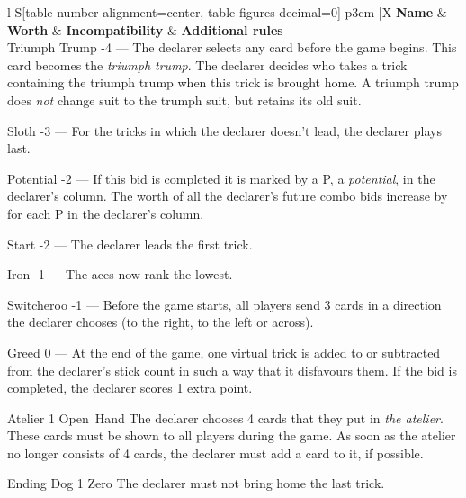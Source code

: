 \begin{table}
	\caption{Special bids}\label{tab:specialBids}
	\begin{center}
		\begin{tabularx}{\textwidth}{
			l
			S[table-number-alignment=center, table-figures-decimal=0]
			p{3cm}
			|X
		}
			\textbf{Name} &
			\textbf{Worth} &
			\textbf{Incompatibility} &
			\textbf{Additional rules}
			\\[-3ex]

			\specialBidItem%
			{Triumph Trump}
			{-4}
			{---}
			{%
				The declarer selects any card before the game begins. This card becomes the \emph{triumph trump}. The declarer decides who takes a trick containing the triumph trump when this trick is brought home. A triumph trump does \emph{not} change suit to the trumph suit, but retains its old suit.
			}

			\specialBidItem%
			{Sloth}
			{-3}
			{---}
			{%
				For the tricks in which the declarer doesn't lead, the declarer plays last.
			}

			\specialBidItem%
			{Potential}
			{-2}
			{---}
			{%
				If this bid is completed it is marked by a P, a \emph{potential}, in the declarer's column. The worth of all the declarer's future combo bids increase by  for each P in the declarer's column.
			}

			\specialBidItem%
			{Start}
			{-2}
			{---}
			{%
				The declarer leads the first trick.
			}

			\specialBidItem%
			{Iron}
			{-1}
			{---}
			{%
				The aces now rank the lowest.
			}

			\specialBidItem%
			{Switcheroo}
			{-1}
			{---}
			{%
				Before the game starts, all players send 3 cards in a direction the declarer chooses (to the right, to the left or across).
			}

			\specialBidItem%
			{Greed}
			{0}
			{---}
			{%
				At the end of the game, one virtual trick is added to or subtracted from the declarer's stick count in such a way that it disfavours them. If the bid is completed, the declarer scores 1 extra point.
			}

			\specialBidItem%
			{Atelier}
			{1}
			{Open~Hand}
			{%
				The declarer chooses 4 cards that they put in \emph{the atelier}. These cards must be shown to all players during the game. As soon as the atelier no longer consists of 4 cards, the declarer must add a card to it, if possible.
			}

			\specialBidItem%
			{Ending Dog}
			{1}
			{Zero}
			{%
				The declarer must not bring home the last trick.
			}


\end{tabularx}
\end{center}
\end{table}
